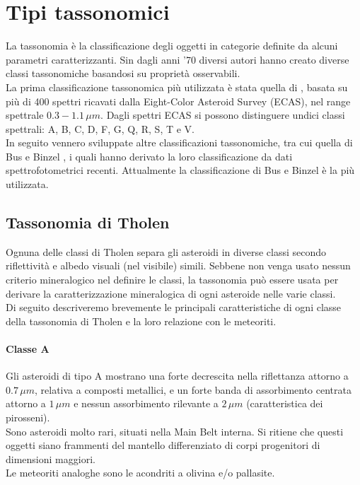 \documentclass[a4paper,11pt,openright]{book}
\begin{document}
\section{Tipi tassonomici}
La tassonomia è la classificazione degli oggetti in categorie definite da alcuni parametri caratterizzanti. Sin dagli anni '70 diversi autori hanno creato diverse classi tassonomiche basandosi su proprietà osservabili.\\
La prima classificazione tassonomica più utilizzata è stata quella di \citet{tholen_asteroid_1984}, basata su più di 400 spettri ricavati dalla Eight-Color Asteroid Survey (ECAS), nel range spettrale $0.3-1.1\,\mu m$. Dagli spettri ECAS si possono distinguere undici classi spettrali: A, B, C, D, F, G, Q, R, S, T e V.\\
In seguito vennero sviluppate altre classificazioni tassonomiche, tra cui quella di Bus e Binzel \citep{bus_phase_2002-1, bus_phase_2002}, i quali hanno derivato la loro classificazione da dati spettrofotometrici recenti. Attualmente la classificazione di Bus e Binzel è la più utilizzata.

\subsection{Tassonomia di Tholen}
Ognuna delle classi di Tholen separa gli asteroidi in diverse classi secondo riflettività e albedo visuali (nel visibile) simili. Sebbene non venga usato nessun criterio mineralogico nel definire le classi, la tassonomia può essere usata per derivare la caratterizzazione mineralogica di ogni asteroide nelle varie classi.\\
Di seguito descriveremo brevemente le principali caratteristiche di ogni classe della tassonomia di Tholen e la loro relazione con le meteoriti. 

\paragraph*{Classe A}
Gli asteroidi di tipo A mostrano una forte decrescita nella riflettanza attorno a $0.7\,\mu m$, relativa a composti metallici, e un forte banda di assorbimento centrata attorno a $1\,\mu m$ e nessun assorbimento rilevante a $2\,\mu m$ (caratteristica dei pirosseni).\\
Sono asteroidi molto rari, situati nella Main Belt interna. Si ritiene che questi oggetti siano frammenti del mantello differenziato di corpi progenitori di dimensioni maggiori.\\
Le meteoriti analoghe sono le acondriti a olivina e/o pallasite.
\end{document}
